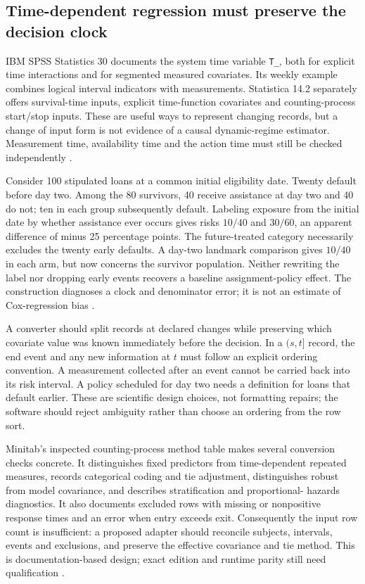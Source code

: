 \subsection{Time-dependent regression must preserve the decision clock}

IBM SPSS Statistics 30 documents the system time variable \texttt{T\_},
both for explicit time interactions and for segmented measured covariates.
Its weekly example combines logical interval indicators with measurements.
Statistica 14.2 separately offers survival-time inputs, explicit time-function
covariates and counting-process start/stop inputs. These are useful ways to
represent changing records, but a change of input form is not evidence of a
causal dynamic-regime estimator. Measurement time, availability time and the
action time must still be checked independently
\citep{exec14_survival_ibm,exec14_survival_statistica}.

Consider 100 stipulated loans at a common initial eligibility date. Twenty
default before day two. Among the 80 survivors, 40 receive assistance at day
two and 40 do not; ten in each group subsequently default. Labeling exposure
from the initial date by whether assistance ever occurs gives risks $10/40$
and $30/60$, an apparent difference of minus 25 percentage points. The
future-treated category necessarily excludes the twenty early defaults.
A day-two landmark comparison gives $10/40$ in each arm, but now concerns
the survivor population. Neither rewriting the label nor dropping early events
recovers a baseline assignment-policy effect. The construction diagnoses a
clock and denominator error; it is not an estimate of Cox-regression bias
\citep{exec14_survival_exact}.

A converter should split records at declared changes while preserving which
covariate value was known immediately before the decision. In a $(s,t]$
record, the end event and any new information at $t$ must follow an explicit
ordering convention. A measurement collected after an event cannot be carried
back into its risk interval. A policy scheduled for day two needs a definition
for loans that default earlier. These are scientific design choices, not
formatting repairs; the software should reject ambiguity rather than choose
an ordering from the row sort.

Minitab's inspected counting-process method table makes several conversion
checks concrete. It distinguishes fixed predictors from time-dependent
repeated measures, records categorical coding and tie adjustment, distinguishes
robust from model covariance, and describes stratification and proportional-
hazards diagnostics. It also documents excluded rows with missing or
nonpositive response times and an error when entry exceeds exit. Consequently
the input row count is insufficient: a proposed adapter should reconcile
subjects, intervals, events and exclusions, and preserve the effective
covariance and tie method. This is documentation-based design; exact edition
and runtime parity still need qualification \citep{exec14_survival_minitab}.

